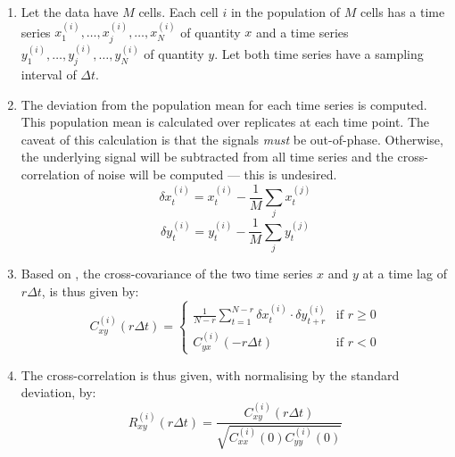 \begin{enumerate}
  \item Let the data have $M$ cells.
        Each cell $i$ in the population of $M$ cells has a time series $x_{1}^{(i)}, \ldots , x_{j}^{(i)}, \ldots , x_{N}^{(i)}$ of quantity $x$ and a time series $y_{1}^{(i)}, \ldots , y_{j}^{(i)}, \ldots , y_{N}^{(i)}$ of quantity $y$.
        Let both time series have a sampling interval of $\Delta t$.
  \item The deviation from the population mean for each time series is computed.
        This population mean is calculated over replicates at each time point.
        The caveat of this calculation is that the signals \emph{must} be out-of-phase.
        Otherwise, the underlying signal will be subtracted from all time series and the cross-correlation of noise will be computed --- this is undesired.
        \begin{equation}
          \delta x_{t}^{(i)} = x_{t}^{(i)} - \frac{1}{M} \sum_{j}x_{t}^{(j)}
          \label{eq:xcf-dmeans-x}
        \end{equation}
        \begin{equation}
          \delta y_{t}^{(i)} = y_{t}^{(i)} - \frac{1}{M} \sum_{j}y_{t}^{(j)}
          \label{eq:xcf-dmeans-y}
        \end{equation}
  \item Based on \textcite{kivietStochasticityMetabolismGrowth2014}, the cross-covariance of the two time series $x$ and $y$ at a time lag of $r\Delta t$, is thus given by:
        \begin{equation}
          C_{xy}^{(i)}(r\Delta t) =
          \begin{cases}
            \frac{1}{N-r} \sum_{t=1}^{N-r} \delta x_{t}^{(i)} \cdot \delta y_{t+r}^{(i)} & \text{if } r \geq 0 \\
            C_{yx}^{(i)}(-r \Delta t) & \text{if } r < 0
          \end{cases}
          \label{eq:xcf-xcov}
        \end{equation}
    \item The cross-correlation is thus given, with normalising by the standard deviation, by:
        \begin{equation}
          R_{xy}^{(i)}(r \Delta t) = \frac{C_{xy}^{(i)}(r \Delta t)}{\sqrt{C_{xx}^{(i)}(0) C_{yy}^{(i)}(0)}}
          \label{eq:xcf-xcf}
        \end{equation}
\end{enumerate}

